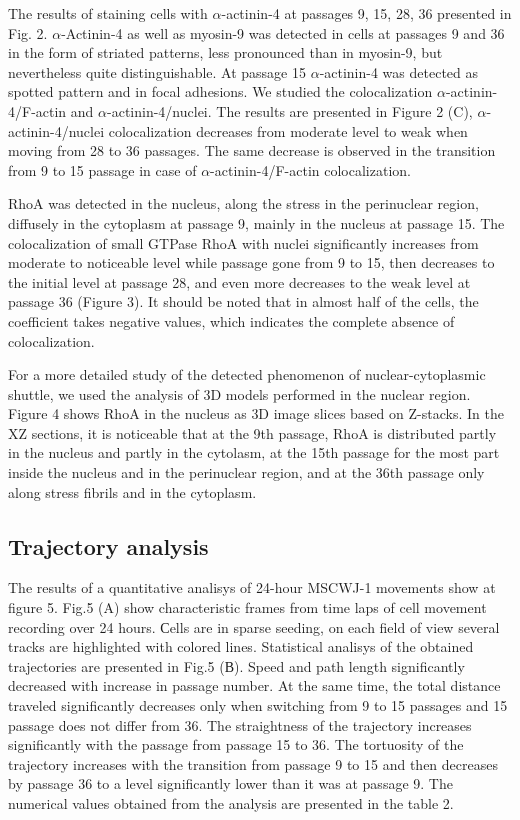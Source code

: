 \documentclass[alpha-refs]{wiley-article}
\begin{document}
The results of staining cells with $\alpha$-actinin-4 at passages 9, 15, 28, 36 presented in Fig. 2.
$\alpha$-Actinin-4 as well as myosin-9 was detected in cells at passages 9 and 36 in the form of striated patterns, less pronounced than in myosin-9, but nevertheless quite distinguishable.
At passage 15 $\alpha$-actinin-4 was detected as spotted pattern and in focal adhesions.
We studied the colocalization $\alpha$-actinin-4/F-actin and $\alpha$-actinin-4/nuclei.
The results are presented in Figure 2 (C), $\alpha$-actinin-4/nuclei colocalization decreases from moderate level to weak when moving from 28 to 36 passages.
The same decrease is observed in the transition from 9 to 15 passage in case of $\alpha$-actinin-4/F-actin colocalization.

RhoA was detected in the nucleus, along the stress in the perinuclear region, diffusely in the cytoplasm at passage 9, mainly in the nucleus at passage 15.
The colocalization of small GTPase RhoA with nuclei significantly increases from moderate to noticeable level while passage gone from 9 to 15, then decreases to the initial level at passage 28, and even more decreases to the weak level at passage 36 (Figure 3).
It should be noted that in almost half of the cells, the coefficient takes negative values, which indicates the complete absence of colocalization.

For a more detailed study of the detected phenomenon of nuclear-cytoplasmic shuttle, we used the analysis of 3D models performed in the nuclear region.
Figure 4 shows RhoA in the nucleus as 3D image slices based on Z-stacks.
In the XZ sections, it is noticeable that at the 9th passage, RhoA is distributed partly in the nucleus and partly in the cytolasm, at the 15th passage for the most part inside the nucleus and in the perinuclear region, and at the 36th passage only along stress fibrils and in the cytoplasm.

\subsection{Trajectory analysis}

The results of a quantitative analisys of 24-hour MSCWJ-1 movements show at figure 5.
Fig.5 (A) show characteristic frames from time laps of cell movement recording over 24 hours.
Сells are in sparse seeding, on each field of view several tracks are highlighted with colored lines.
Statistical analisys of the obtained trajectories are presented in Fig.5 (В).
Speed and path length significantly decreased with increase in passage number.
At the same time, the total distance traveled significantly decreases only when switching from 9 to 15 passages and 15 passage does not differ from 36.
The straightness of the trajectory increases significantly with the passage from passage 15 to 36.
The tortuosity of the trajectory increases with the transition from passage 9 to 15 and then decreases by passage 36 to a level significantly lower than it was at passage 9.
The numerical values obtained from the analysis are presented in the table 2.
\end{document}
